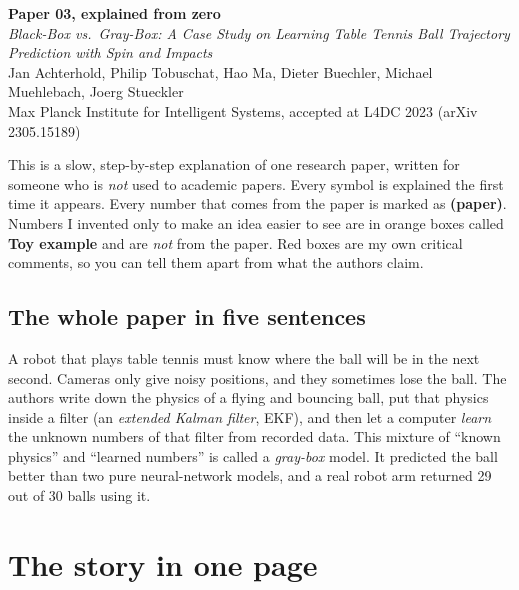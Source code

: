 \documentclass[11pt,a4paper]{article}
\begin{document}
\setcounter{tocdepth}{1}

\begin{center}
{\LARGE\bfseries\color{cblue} Paper 03, explained from zero}\\[0.6em]
{\large \textit{Black-Box vs.\ Gray-Box: A Case Study on Learning Table Tennis Ball Trajectory Prediction with Spin and Impacts}}\\[0.5em]
Jan Achterhold, Philip Tobuschat, Hao Ma, Dieter Buechler, Michael Muehlebach, Joerg Stueckler\\
Max Planck Institute for Intelligent Systems, accepted at L4DC 2023 (arXiv 2305.15189)
\end{center}

\begin{idea}
This is a slow, step-by-step explanation of one research paper, written for someone who is
\emph{not} used to academic papers. Every symbol is explained the first time it appears. Every
number that comes from the paper is marked as \textbf{(paper)}. Numbers I invented only to
make an idea easier to see are in orange boxes called \textbf{Toy example} and are
\emph{not} from the paper. Red boxes are my own critical comments, so you can tell them apart
from what the authors claim.
\end{idea}

\subsection*{The whole paper in five sentences}
A robot that plays table tennis must know where the ball will be in the next second. Cameras
only give noisy positions, and they sometimes lose the ball. The authors write down the physics
of a flying and bouncing ball, put that physics inside a filter (an \emph{extended Kalman
filter}, EKF), and then let a computer \emph{learn} the unknown numbers of that filter from
recorded data. This mixture of ``known physics'' and ``learned numbers'' is called a
\emph{gray-box} model. It predicted the ball better than two pure neural-network models, and a
real robot arm returned 29 out of 30 balls using it.

\tableofcontents

\section{The story in one page}
\end{document}
